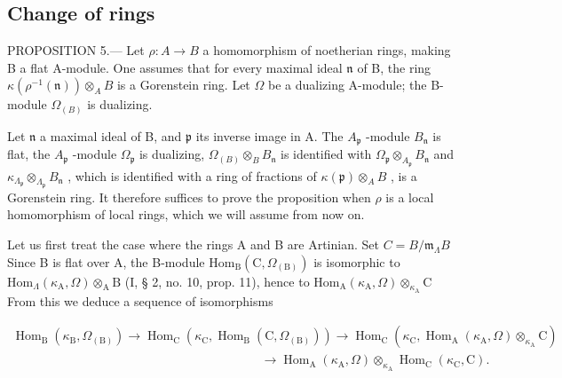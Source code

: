 \subsection{Change of rings}

PROPOSITION 5.--- Let \(\rho: A \to B\) a homomorphism of noetherian rings, making B a flat A-module. One assumes that for every maximal ideal \(\mathfrak{n}\) of B, the ring \(\kappa(\rho^{-1}(\mathfrak{n})) \otimes_{A} B\) is a Gorenstein ring. Let \(\Omega\) be a dualizing A-module; the B-module \(\Omega_{(B)}\) is dualizing.

Let \(\mathfrak{n}\) a maximal ideal of B, and \(\mathfrak{p}\) its inverse image in A. The \(A_{\mathfrak{p}}\) -module \(B_{\mathfrak{n}}\) is flat, the \(A_{\mathfrak{p}}\) -module \(\Omega_{\mathfrak{p}}\) is dualizing, \(\Omega_{(B)} \otimes_B B_{\mathfrak{n}}\) is identified with \(\Omega_{\mathfrak{p}} \otimes_{A_{\mathfrak{p}}} B_{\mathfrak{n}}\) and \(\kappa_{\Lambda_{\mathfrak{p}}} \otimes_{\Lambda_{\mathfrak{p}}} B_{\mathfrak{n}}\) , which is identified with a ring of fractions of \(\kappa(\mathfrak{p}) \otimes_A B\) , is a Gorenstein ring. It therefore suffices to prove the proposition when \(\rho\) is a local homomorphism of local rings, which we will assume from now on.

Let us first treat the case where the rings A and B are Artinian. Set \(C = B / \mathfrak{m}_{\Lambda}B\) Since B is flat over A, the B-module \(\mathrm{Hom}_{\mathrm{B}}(\mathrm{C},\Omega_{(\mathrm{B})})\) is isomorphic to \(\mathrm{Hom}_{\Lambda}(\kappa_{\mathrm{A}},\Omega)\otimes_{\mathrm{A}}\mathrm{B}\) (I, § 2, no. 10, prop. 11), hence to \(\mathrm{Hom}_{\mathrm{A}}(\kappa_{\mathrm{A}},\Omega)\otimes_{\kappa_{\mathrm{A}}}\mathrm{C}\) From this we deduce a sequence of isomorphisms

\[
\begin{array}{c} \operatorname{Hom} _ {\mathrm{B}} (\kappa_ {\mathrm{B}}, \Omega_ {(\mathrm{B})}) \longrightarrow \operatorname{Hom} _ {\mathrm{C}} (\kappa_ {\mathrm{C}}, \operatorname{Hom} _ {\mathrm{B}} (\mathrm{C}, \Omega_ {(\mathrm{B})})) \longrightarrow \operatorname{Hom} _ {\mathrm{C}} (\kappa_ {\mathrm{C}}, \operatorname{Hom} _ {\mathrm{A}} (\kappa_ {\mathrm{A}}, \Omega) \otimes_ {\kappa_ {\mathrm{A}}} \mathrm{C}) \\ \qquad \qquad \qquad \qquad \qquad \qquad \qquad \qquad \qquad \qquad \longrightarrow \operatorname{Hom} _ {\mathrm{A}} (\kappa_ {\mathrm{A}}, \Omega) \otimes_ {\kappa_ {\mathrm{A}}} \operatorname{Hom} _ {\mathrm{C}} (\kappa_ {\mathrm{C}}, \mathrm{C}). \end{array}
\]

